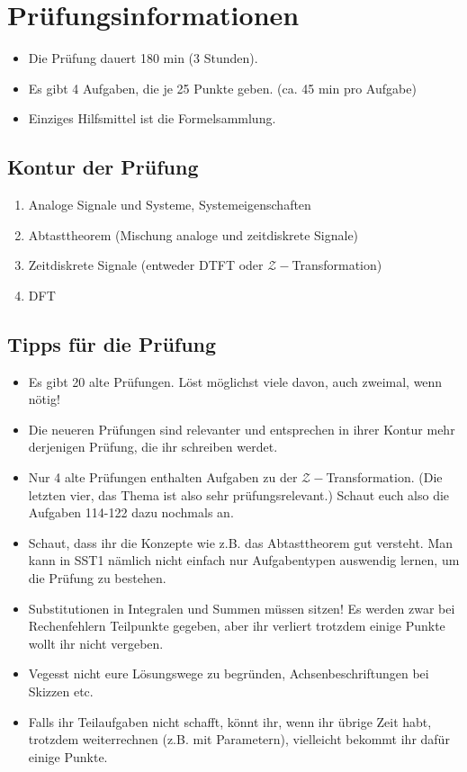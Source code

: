 \documentclass[11pt]{article}
\begin{document}
\section*{Prüfungsinformationen}
\vspace*{-0.5cm}
\begin{itemize}
    \item Die Prüfung dauert 180 min (3 Stunden).
    \item Es gibt 4 Aufgaben, die je 25 Punkte geben. (ca. 45 min pro Aufgabe)
    \item Einziges Hilfsmittel ist die Formelsammlung.
\end{itemize}

\subsection*{Kontur der Prüfung}
\vspace*{-0.5cm}
\begin{enumerate}
    \item Analoge Signale und Systeme, Systemeigenschaften
    \item Abtasttheorem (Mischung analoge und zeitdiskrete Signale)
    \item Zeitdiskrete Signale (entweder DTFT oder $\mathcal{Z}-$Transformation)
    \item DFT
\end{enumerate}

\subsection*{Tipps für die Prüfung}
\vspace*{-0.5cm}
\begin{itemize}
    \item Es gibt 20 alte Prüfungen. Löst möglichst viele davon, auch zweimal, wenn nötig!
    \item Die neueren Prüfungen sind relevanter und entsprechen in ihrer Kontur mehr derjenigen Prüfung, die ihr schreiben werdet.
    \item Nur 4 alte Prüfungen enthalten Aufgaben zu der $\mathcal{Z}-$Transformation. (Die letzten vier, das Thema ist also sehr prüfungsrelevant.) Schaut euch also die Aufgaben 114-122 dazu nochmals an.
    \item Schaut, dass ihr die Konzepte wie z.B. das Abtasttheorem gut versteht. Man kann in SST1 nämlich nicht einfach nur Aufgabentypen auswendig lernen, um die Prüfung zu bestehen.
    \item Substitutionen in Integralen und Summen müssen sitzen! Es werden zwar bei Rechenfehlern Teilpunkte gegeben, aber ihr verliert trotzdem einige  Punkte wollt ihr nicht vergeben.
    \item Vegesst nicht eure Lösungswege zu begründen, Achsenbeschriftungen bei Skizzen etc.
    \item Falls ihr Teilaufgaben nicht schafft, könnt ihr, wenn ihr übrige Zeit habt, trotzdem weiterrechnen (z.B. mit Parametern), vielleicht bekommt ihr dafür einige Punkte.
\end{itemize}
\end{document}
